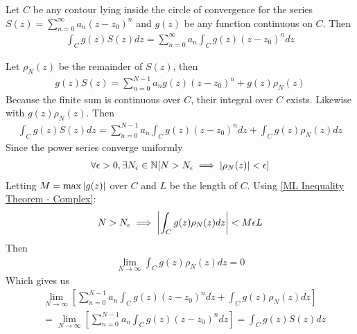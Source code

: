 \documentclass[12pt, english]{book}
\makeatletter
\renewenvironment{proof}[1][\proofname]{\par
	\pushQED{\qed}%
	\normalfont \topsep6\p@\@plus6\p@\relax
	\list{}{%
		\settowidth{\leftmargin}{\itshape\proofname:\hskip\labelsep}%
		\setlength{\labelwidth}{0pt}%
		\setlength{\itemindent}{-\leftmargin}%
	}%
	\item[\hskip\labelsep\itshape#1\@addpunct{:}]\ignorespaces
	}{ \popQED\endlist\@endpefalse}
\makeatother
\begin{document}
	\begin{theorem}
		\label{Integration of Power Series Theorem - Complex}
		Let \(C\) be any contour lying inside the circle of convergence for the series 
		\(S(z) = \sum_{n=0}^{\infty} a_n (z-z_0)^n\) and \(g(z)\) be any function continuous on \(C\). Then 
		\begin{align*}
			\int_{C} g(z) S(z) dz = \sum_{n=0}^{\infty} a_n \int_{C} g(z) (z-z_0)^n dz
		\end{align*}
	\end{theorem}
	\begin{proof}
		Let \(\rho_N(z)\) be the remainder of \(S(z)\), then 
		\begin{align*}
			g(z) S(z) = \sum_{n=0}^{N-1}a_n g(z) (z-z_0)^n + g(z) \rho_N(z)
		\end{align*}
		Because the finite sum is continuous over \(C\), their integral over \(C\) exists. Likewise with \(g(z) \rho_N(z)\). Then
		\begin{align*}
			\int_{C} g(z) S(z) dz = \sum_{n=0}^{N-1} a_n \int_{C} g(z) (z-z_0)^n dz + \int_{C} g(z) \rho_N (z) dz
		\end{align*}
		Since the power series converge uniformly
		\begin{align*}
			\forall \epsilon >0, \exists N_\epsilon \in \mathbb{N}
			[N > N_\epsilon \implies \abs{\rho_N(z)} < \epsilon]
		\end{align*}
		Letting \(M = \max \abs{g(z)}\) over \(C\) and \(L\) be the length of \(C\). Using \cref{ML Inequality Theorem - Complex}:
		\begin{align*}
			N > N_\epsilon \implies \abs{\int_{C} g(z) \rho_N(z) dz} < M \epsilon L
		\end{align*}
		Then 
		\begin{align*}
			\lim_{N \rightarrow \infty} \int_{C} g(z) \rho_N (z) dz = 0
		\end{align*}
		Which gives us 
		\begin{align*}
			&\lim_{N \rightarrow \infty} \left[
			\sum_{n=0}^{N-1} a_n \int_{C} g(z) (z-z_0)^n dz + \int_{C} g(z) \rho_N (z) dz
			\right] \\
			&= \lim_{N \rightarrow \infty} \left[
			\sum_{n=0}^{N-1} a_n \int_{C} g(z) (z-z_0)^n dz
			\right] 
			= \int_{C} g(z) S(z) dz
		\end{align*}
	\end{proof}
\end{document}

